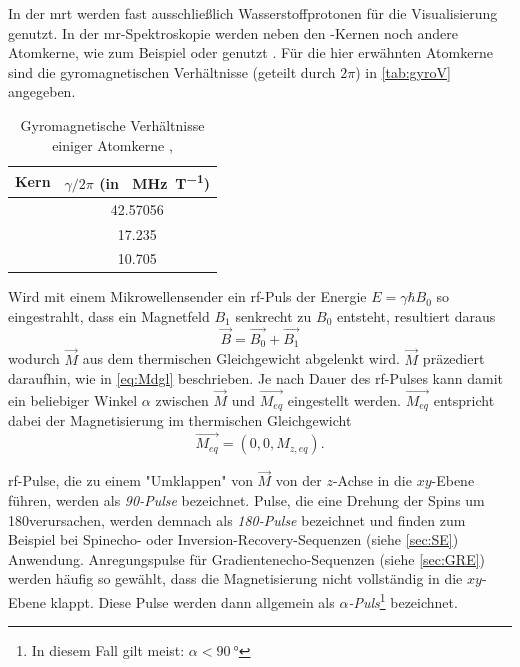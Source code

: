 In der \gls{mrt} werden fast ausschließlich Wasserstoffprotonen für die Visualisierung genutzt. In der \gls{mr}-Spektroskopie werden neben den -Kernen noch andere Atomkerne, wie zum Beispiel  oder  genutzt \cite{Andrade2014}. Für die hier erwähnten Atomkerne sind die gyromagnetischen Verhältnisse (geteilt durch $2\pi$) in \autoref{tab:gyroV} angegeben.

\begin{table}[H]
	\centering
	\caption[Auswahl gyromagnetischer Verhältnisse]{Gyromagnetische Verhältnisse einiger Atomkerne \cite{Seidel2015},\cite{Weast1984}}
	\label{tab:gyroV}
	\begin{tabular}{lS}
		\toprule
		\textbf{Kern} & \textbf{$\gamma/2\pi$ (in \SI{}{\mega\hertz\per\tesla})} \\
		\midrule
		 & 42.57056 \\
		 & 17.235 \\
		 & 10.705 \\
		\bottomrule
	\end{tabular}
\end{table}

Wird mit einem Mikrowellensender ein \gls{rf}-Puls der Energie $E=\gamma \hbar B_0$ so eingestrahlt, dass ein Magnetfeld $B_1$ senkrecht zu $B_0$ entsteht, resultiert daraus
\begin{equation}
	\vec{B}=\vec{B_0}+\vec{B_1}
\end{equation}
wodurch $\vec{M}$ aus dem thermischen Gleichgewicht abgelenkt wird. $\vec{M}$ präzediert daraufhin, wie in \autoref{eq:Mdgl} beschrieben. Je nach Dauer des \gls{rf}-Pulses kann damit ein beliebiger Winkel $\alpha$ zwischen $\vec{M}$ und $\vec{M_{eq}}$ eingestellt werden. $\vec{M_{eq}}$ entspricht dabei der Magnetisierung im thermischen Gleichgewicht
\begin{equation}
	\vec{M_{eq}} = (0,0,M_{z,eq}).
\end{equation}

\gls{rf}-Pulse, die zu einem "Umklappen" von $\vec{M}$ von der $z$-Achse in die $xy$-Ebene führen, werden als \textit{90\degree-Pulse} bezeichnet. Pulse, die eine Drehung der Spins um 180\degree verursachen, werden demnach als \textit{180\degree-Pulse} bezeichnet und finden zum Beispiel bei Spinecho- oder Inversion-Recovery-Sequenzen (siehe \autoref{sec:SE}) Anwendung. Anregungspulse für Gradienten\-echo-Sequenzen (siehe \autoref{sec:GRE}) werden häufig so gewählt, dass die Magnetisierung nicht vollständig in die $xy$-Ebene klappt. Diese Pulse werden dann allgemein als \textit{$\alpha$-Puls}\footnote{In diesem Fall gilt meist: $\alpha<\SI{90}{\degree}$} bezeichnet.

